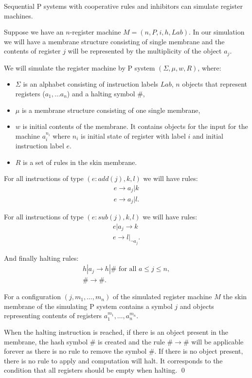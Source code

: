 \begin{veta}
  Sequential P systems with cooperative rules and inhibitors can simulate register machines.
\end{veta}


\begin{dokaz}
\label{proof:reg_by_inh}
  Suppose we have an $n$-register machine $M = (n,P,i,h,Lab)$. In our simulation we will have a membrane structure consisting of single membrane and the contents of register $j$ will be represented by the multiplicity of the object $a_j$.

  We will simulate the register machine by P system $(\Sigma, \mu, w, R)$, where:
  \begin{itemize}
    \item $\Sigma$ is an alphabet consisting of instruction labels $Lab$, $n$ objects that represent registers ($a_1,\dots a_n$) and a halting symbol $\#$,
    \item $\mu$ is a membrane structure consisting of one single membrane,
    \item $w$ is initial contents of the membrane. It contains objects for the input for the machine $a_i^{n_i}$ where $n_i$ is initial state of register with label $i$ and initial instruction label $e$.
    \item $R$ is a set of rules in the skin membrane.
  \end{itemize}
    
  For all instructions of type $(e : add(j), k, l)$ we will have rules:
  \begin{align*}
    e \rightarrow a_j|k\\
    e \rightarrow a_j|l.
  \end{align*}

  For all instructions of type $(e : sub(j), k, l)$ we will have rules:
  \begin{align*}
    e|a_j \rightarrow k\\
    e \rightarrow l|_{\neg a_j}.
  \end{align*}

  And finally halting rules:
  \begin{align*}
    h|a_j \rightarrow h|\#\text{~for all~}a\leq j\leq n,\\
    \# \rightarrow \#.
  \end{align*}

  For a configuration $(j, m_1, \dots, m_n)$ of the simulated register machine $M$ the skin membrane of the simulating P system contains a symbol $j$ and objects representing contents of registers $a_1^{m_1}, \dots, a_n^{m_n}$.

  When the halting instruction is reached, if there is an object present in the membrane, the hash symbol $\#$ is created and the rule $\# \rightarrow \#$ will be applicable forever as there is no rule to remove the symbol $\#$. If there is no object present, there is no rule to apply and computation will halt. It corresponds to the condition that all registers should be empty when halting. \qed
\end{dokaz}